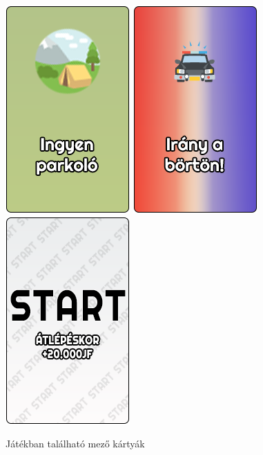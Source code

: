 \begin{figure}[h!]
\includegraphics[scale=0.4]{images/parkolo.png}
\includegraphics[scale=0.4]{images/bori.png}
\includegraphics[scale=0.4]{images/start.png}
\caption{Játékban található mező kártyák}
\label{fig:fields}
\end{figure}

